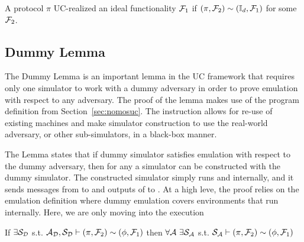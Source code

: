 \begin{definition}[UC-Realize]
A protocol $\pi$ UC-realized an ideal functionality $\mathcal{F}_1$ if $(\pi, \mathcal{F}_2) \sim (\mathbb{I}_d, \mathcal{F}_1)$ for some $\mathcal{F}_2$.
\end{definition}

\subsection{Dummy Lemma}
The Dummy Lemma is an important lemma in the UC framework that requires only one simulator to work with a dummy adversary in order to prove emulation with respect to any adversary.
The proof of the lemma makes use of the  program definition from Section~\ref{sec:nomosuc}.
The instruction allows for re-use of existing machines and make simulator construction to use the real-world adversary, or other sub-simulators, in a black-box manner.

The Lemma states that if dummy simulator satisfies emulation with respect to the dummy adversary, then for any \Adversary a simulator can be constructed with the dummy simulator. 
The constructed simulator simply runs \Adversary and \Dummysim internally, and it sends messages from \Environment to \Adversary and outputs of \Adversary to \Dummysim.
At a high leve, the proof relies on the emulation definition where dummy emulation covers environments that run \Adversary internally. Here, we are only moving \Adversary into the execution

\begin{theorem}\label{thm:dummy}
If $\exists \mathcal{S}_{\mathcal{D}}$ s.t. $ \mathcal{A}_\mathcal{D}, \mathcal{S}_{\mathcal{D}} \vdash (\pi, \mathcal{F}_2) \sim (\phi, \mathcal{F}_1)$ then $\forall \Adversary \ \exists \Simulator_\Adversary$ s.t. $\mathcal{S}_{\mathcal{A}} \vdash  (\pi, \mathcal{F}_2) \sim (\phi, \mathcal{F}_1)$ 
\end{theorem}

